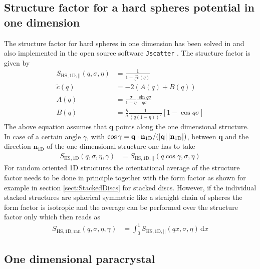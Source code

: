 \subsection{Structure factor for a hard spheres potential in one dimension} \hspace{1pt}

The structure factor for hard spheres in one dimension has been solved in \cite{Leutheusser1984} and also implemented in the open source software \texttt{Jscatter} \cite{Biehl2019}. The structure factor is given by
\begin{align}
\label{eq:SQ_HS_1D}
  S_\mathrm{HS,1D,||}(q,\sigma,\eta) & = \frac{1}{1-\frac{\eta}{\sigma} \tilde{c}(q)} \\
\label{eq:cQ_HS_1D}
  \tilde{c}(q) &= -2\left(A(q)+B(q)\right) \\
  A(q) &= \frac{\sigma}{1-\eta} \frac{\sin q\sigma}{q\sigma} \\
  B(q) &= \frac{\eta}{\sigma}\frac{1}{\left(q\left(1-\eta\right)\right)^2}\left[1-\cos q\sigma\right]
\end{align}
The above equation assumes that $\mathbf{q}$ points along the one dimensional structure. In case of a certain angle $\gamma$, with $\cos \gamma=\mathbf{q}\cdot\mathbf{n}_\mathrm{1D}/(\abs{\mathbf{q}}\,\abs{\mathbf{n}_\mathrm{1D}})$, between $\mathbf{q}$ and the direction $\mathbf{n}_\mathrm{1D}$ of the one dimensional structure one has to take
\begin{align}
\label{eq:SQ_HS_1D}
  S_\mathrm{HS,1D}(q,\sigma,\eta,\gamma) & = S_\mathrm{HS,1D,||}(q\cos\gamma,\sigma,\eta)
\end{align}
For random oriented 1D structures the orientational average of the structure factor needs to be done in principle together with the form factor as shown for example in section \ref{sect:StackedDiscs} for stacked discs. However, if the individual stacked structures are spherical symmetric like a straight chain of spheres the form factor is isotropic and the average can be performed over the structure factor only which then reads as
\begin{align}
\label{eq:SQ_HS_1D_random}
  S_\mathrm{HS,1D,ran}(q,\sigma,\eta,\gamma) & = \int_0^1 S_\mathrm{HS,1D,||}(qx,\sigma,\eta) \, \mathrm{d}x
\end{align}

\subsection{One dimensional paracrystal}  \hspace{1pt}


